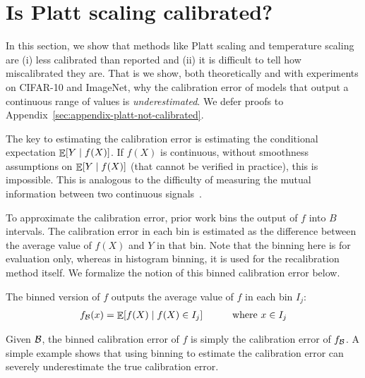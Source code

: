 \section{Is Platt scaling calibrated?}
\label{sec:challenges-measuring}

In this section, we show that methods like Platt scaling and temperature scaling are (i) less calibrated than reported and (ii) it is difficult to tell how miscalibrated they are. That is we show, both theoretically and with experiments on CIFAR-10 and ImageNet, why the calibration error of models that output a continuous range of values is \emph{underestimated}.
We defer proofs to Appendix~\ref{sec:appendix-platt-not-calibrated}.

The key to estimating the calibration error is estimating the conditional expectation $\mathop{\mathbb{E}}[Y \mid f(X)]$.  If $f(X)$ is continuous, without smoothness assumptions on $\mathop{\mathbb{E}}[Y \mid f(X)]$ (that cannot be verified in practice), this is impossible. This is analogous to the difficulty of measuring the mutual information between two continuous signals~\cite{paninski2003entropy}.

To approximate the calibration error, prior work bins the output of $f$ into $B$ intervals.
The calibration error in each bin is estimated as the difference between the average value of $f(X)$ and $Y$ in that bin.
Note that the binning here is for evaluation only, whereas in histogram binning, it is used for the recalibration method itself.
We formalize the notion of this binned calibration error below.

\begin{definition}
The binned version of $f$ outputs the average value of $f$ in each bin $I_j$:
\begin{align}
  f_{\mathcal{B}}(x) = \mathop{\mathbb{E}}[f(X) \mid f(X) \in I_j] \quad\quad\quad \mbox{where }x \in I_j
\end{align} 
\end{definition}

Given $\mathcal{B}{}$, the binned calibration error of $f$ is simply the calibration error of $f_{\mathcal{B}{}}$.
A simple example shows that using binning to estimate the calibration error can severely underestimate the true calibration error.

\newcommand{\continuousNotCalibratedText}{
  For any binning scheme $\bins{}$, and continuous bijective function $f : [0, 1] \to [0, 1]$, there exists a distribution \pl{mathbb}$P$ over $\mathcal{X}, \mathcal{Y}$ s.t. $\ce(f_{\bins{}}) = 0$ but $\ce(f) \geq 0.49$.
Note that for all $f$, $0 \leq \ce(f) \leq 1$.
}

